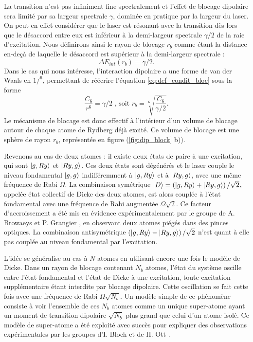La transition n'est pas infiniment fine spectralement et l'effet de blocage dipolaire sera limité par sa largeur spectrale $\gamma$, dominée en pratique par la largeur du laser.
On peut en effet considérer que le laser est résonant avec la transition dès lors que le désaccord entre eux est inférieur à la demi-largeur spectrale $\gamma/2$ de la raie d'excitation.
Nous définirons ainsi le \og rayon de blocage \fg{} $r_b$ comme étant la distance en-deçà de laquelle le désaccord est supérieur à la demi-largeur spectrale :
\begin{equation}
\label{eq:def_condit_bloc}
\Delta E_{int}(r_b) = \gamma /2 .
\end{equation}
%
Dans le cas qui nous intéresse, l'interaction dipolaire a une forme de van der Waals en $1/^6$, permettant de réécrire l'équation \eqref{eq:def_condit_bloc} sous la forme
\begin{equation}
\label{eq:def_rayon_bloc}
\frac{C_6}{r^6} = \gamma /2 \text{ , soit } r_b = \sqrt[6]{\frac{C_6}{\gamma /2}} .
\end{equation}
%
Le mécanisme de blocage est donc effectif à l'intérieur d'un \og volume de blocage\fg{} autour de chaque atome de Rydberg déjà excité.
Ce volume de blocage est une sphère de rayon $r_b$, représentée en figure (\ref{fig:dip_block} b)).

Revenons au cas de deux atomes :
il existe deux états de paire à une excitation, qui sont $\ket{g,Ry}$ et $\ket{Ry,g}$.
Ces deux états sont dégénérés et le laser couple le niveau fondamental $\ket{g,g}$ indifféremment à $\ket{g,Ry}$ et à $\ket{Ry,g}$, avec une même fréquence de Rabi $\Omega$.
La combinaison symétrique $\ket{D} = \left( \ket{g,Ry} + \ket{Ry,g} \right) / \sqrt{2}$, appelée état collectif de Dicke des deux atomes, est alors couplée à l'état fondamental avec une fréquence de Rabi augmentée $\Omega\sqrt{2}$.
Ce facteur d'accroissement a été mis en évidence expérimentalement par le groupe de A. Browaeys et P. Grangier \cite{MX_BROWAEYS_COLLECRABIBLOCK}, en observant deux atomes piégés dans des pinces optiques.
La combinaison antisymétrique $\left( \ket{g,Ry} - \ket{Ry,g} \right) / \sqrt{2}$ n'est quant à elle pas couplée au niveau fondamental par l'excitation.

L'idée se généralise au cas à $N$ atomes en utilisant encore une fois le modèle de Dicke.
Dans un rayon de blocage contenant $N_b$ atomes, l'état du système oscille entre l'état fondamental et l'état de Dicke à une excitation, toute excitation supplémentaire étant interdite par blocage dipolaire.
Cette oscillation se fait cette fois avec une fréquence de Rabi $\Omega\sqrt{N_b}$.
Un modèle simple de ce phénomène consiste à voir l'ensemble de ces $N_b$ atomes comme un unique \og super-atome \fg{} ayant un moment de transition dipolaire $\sqrt{N_b}$ plus grand  que celui d'un atome isolé.
Ce modèle de super-atome a été exploité avec succès pour expliquer des observations expérimentales par les groupes d'I. Bloch \cite{MX_BLOCH_SUPERATOM} et de H. Ott \cite{MX_OTT_SUPERATOM}.


